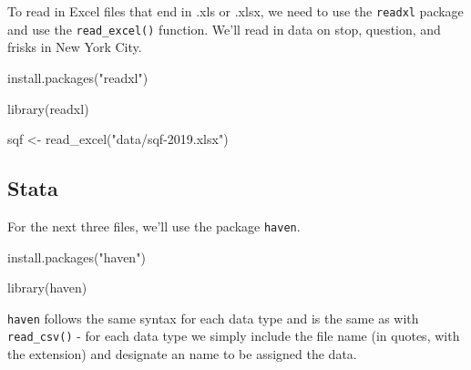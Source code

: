 \documentclass[
]{krantz}
\makeatletter
\newenvironment{Shaded}{\begin{snugshade}}{\end{snugshade}}
\newcommand{\FunctionTok}[1]{\textcolor[rgb]{0,0,0}{#1}}
\newcommand{\NormalTok}[1]{#1}
\newcommand{\OtherTok}[1]{\textcolor[rgb]{0.37,0.37,0.37}{#1}}
\newcommand{\StringTok}[1]{\textcolor[rgb]{0.5,0.5,0.5}{#1}}
\newenvironment{kframe}{%
\medskip{}
\setlength{\fboxsep}{.8em}
 \def\at@end@of@kframe{}%
 \ifinner\ifhmode%
  \def\at@end@of@kframe{\end{minipage}}%
  \begin{minipage}{\columnwidth}%
 \fi\fi%
 \def\FrameCommand##1{\hskip\@totalleftmargin \hskip-\fboxsep
 \colorbox{shadecolor}{##1}\hskip-\fboxsep
     \hskip-\linewidth \hskip-\@totalleftmargin \hskip\columnwidth}%
 \MakeFramed {\advance\hsize-\width
   \@totalleftmargin\z@ \linewidth\hsize
   \@setminipage}}%
 {\par\unskip\endMakeFramed%
 \at@end@of@kframe}
\renewenvironment{Shaded}{\begin{kframe}}{\end{kframe}}
\makeatother
\begin{document}
To read in Excel files that end in .xls or .xlsx, we need to use the \texttt{readxl} package and use the \texttt{read\_excel()} function. We'll read in data on stop, question, and frisks in New York City.

\begin{Shaded}
\begin{Highlighting}[]
\FunctionTok{install.packages}\NormalTok{(}\StringTok{"readxl"}\NormalTok{)}
\end{Highlighting}
\end{Shaded}

\begin{Shaded}
\begin{Highlighting}[]
\FunctionTok{library}\NormalTok{(readxl)}
\end{Highlighting}
\end{Shaded}

\begin{Shaded}
\begin{Highlighting}[]
\NormalTok{sqf }\OtherTok{\textless{}{-}} \FunctionTok{read\_excel}\NormalTok{(}\StringTok{"data/sqf{-}2019.xlsx"}\NormalTok{)}
\end{Highlighting}
\end{Shaded}

\hypertarget{stata}{%
\subsection{Stata}\label{stata}}

For the next three files, we'll use the package \texttt{haven}.

\begin{Shaded}
\begin{Highlighting}[]
\FunctionTok{install.packages}\NormalTok{(}\StringTok{"haven"}\NormalTok{)}
\end{Highlighting}
\end{Shaded}

\begin{Shaded}
\begin{Highlighting}[]
\FunctionTok{library}\NormalTok{(haven)}
\end{Highlighting}
\end{Shaded}

\texttt{haven} follows the same syntax for each data type and is the same as with \texttt{read\_csv()} - for each data type we simply include the file name (in quotes, with the extension) and designate an name to be assigned the data.
\end{document}
